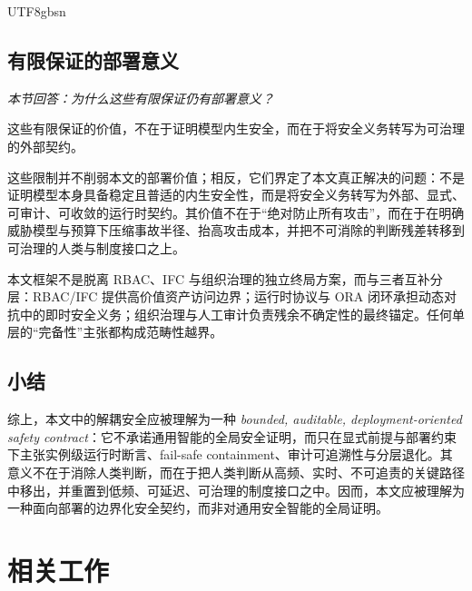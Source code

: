 \documentclass[letterpaper,twocolumn,10pt]{article}
\begin{document}
\begin{CJK}{UTF8}{gbsn}
\subsection{有限保证的部署意义}

\noindent\textit{本节回答：为什么这些有限保证仍有部署意义？}

\noindent 这些有限保证的价值，不在于证明模型内生安全，而在于将安全义务转写为可治理的外部契约。

这些限制并不削弱本文的部署价值；相反，它们界定了本文真正解决的问题：不是证明模型本身具备稳定且普适的内生安全性，而是将安全义务转写为外部、显式、可审计、可收敛的运行时契约。其价值不在于``绝对防止所有攻击''，而在于在明确威胁模型与预算下压缩事故半径、抬高攻击成本，并把不可消除的判断残差转移到可治理的人类与制度接口之上。

本文框架不是脱离 RBAC、IFC 与组织治理的独立终局方案，而与三者互补分层：RBAC/IFC 提供高价值资产访问边界；运行时协议与 ORA 闭环承担动态对抗中的即时安全义务；组织治理与人工审计负责残余不确定性的最终锚定。任何单层的``完备性''主张都构成范畴性越界。

\subsection{小结}

综上，本文中的解耦安全应被理解为一种 \emph{bounded, auditable, deployment-oriented safety contract}：它不承诺通用智能的全局安全证明，而只在显式前提与部署约束下主张实例级运行时断言、fail-safe containment、审计可追溯性与分层退化。其意义不在于消除人类判断，而在于把人类判断从高频、实时、不可追责的关键路径中移出，并重置到低频、可延迟、可治理的制度接口之中。因而，本文应被理解为一种面向部署的边界化安全契约，而非对通用安全智能的全局证明。

\section{相关工作}


\end{CJK}
\end{document}
